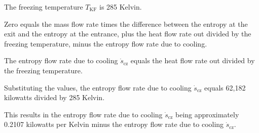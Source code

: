 The freezing temperature \( T_{\text{KF}} \) is 285 Kelvin.

Zero equals the mass flow rate times the difference between the entropy at the exit and the entropy at the entrance, plus the heat flow rate out divided by the freezing temperature, minus the entropy flow rate due to cooling.

The entropy flow rate due to cooling \( \dot{s}_{\text{cz}} \) equals the heat flow rate out divided by the freezing temperature.

Substituting the values, the entropy flow rate due to cooling \( \dot{s}_{\text{cz}} \) equals 62,182 kilowatts divided by 285 Kelvin.

This results in the entropy flow rate due to cooling \( \dot{s}_{\text{cz}} \) being approximately 0.2107 kilowatts per Kelvin minus the entropy flow rate due to cooling \( \dot{s}_{\text{cz}} \).